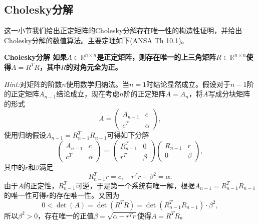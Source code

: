 \documentclass[a4paper,10pt]{ctexart}
\begin{document}
\subsection{Cholesky分解}
这一小节我们给出正定矩阵的Cholesky分解存在唯一性的构造性证明，并给出Cholesky分解的数值算法。主要定理如下(ANSA Th 10.1)。
\begin{theorem}\label{th:CholeskyDec}\bf{\textup{Cholesky分解}}
    如果$ A\in \mathbb{R}^{n\times n} $是正定矩阵，则存在唯一的上三角矩阵$ R\in \mathbb{R}^{n\times n} $使得$ A = R^TR $，其中$ R $的对角元全为正。
\end{theorem}
\noindent \emph{Hint:}对矩阵的阶数$ n $使用数学归纳法。当$ n=1 $时结论显然成立。假设对于$ n-1 $阶的正定矩阵$ A_{n-1} $结论成立，现在考虑$ n $阶的正定矩阵$ A = A_n $，将$ A $写成分块矩阵的形式
\[
    A = 
    \begin{pmatrix}
        A_{n-1} & c\\
        c^T & \alpha
    \end{pmatrix},
\]
使用归纳假设$ A_{n-1} = R_{n-1}^T R_{n-1} $可得如下分解
\begin{equation}
    \begin{pmatrix}
        A_{n-1} & c\\
        c^T & \alpha
    \end{pmatrix} = 
    \begin{pmatrix}
        R_{n-1}^T & 0\\
        r^T & \beta
    \end{pmatrix}
    \begin{pmatrix}
        R_{n-1} & r\\
        0 & \beta
    \end{pmatrix},
\end{equation}
其中的$ r $和$ \beta $满足
\begin{equation}
    R_{n-1}^T r = c,\quad r^T r + \beta^2 = \alpha.
\end{equation}
由于$ A $的正定性，$ R_{n-1}^T $可逆，于是第一个系统有唯一解，根据$ A_{n-1} = R_{n-1}^T R_{n-1} $的唯一性可得$ r $的存在唯一性。又因为
\[
    0< \det(A) = \det(R^T R) = \det(R_{n-1}^T R_{n-1})\cdot \beta^2,
\]
所以$ \beta^2>0 $，存在唯一的正值$ \beta = \sqrt{\alpha - r^T r} $使得$ A = R^T R $。
\end{document}
